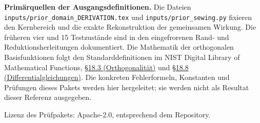 \documentclass[10pt,a4paper]{article}
\begin{document}
\textbf{Primärquellen der Ausgangsdefinitionen.}
Die Dateien \texttt{inputs/prior\_domain\_DERIVATION.tex} und
\texttt{inputs/prior\_sewing.py} fixieren den Kernbereich und die exakte
Rekonstruktion der gemeinsamen Wirkung. Die früheren vier und 15 Testzustände
sind in den eingefrorenen Rand- und Reduktionsherleitungen dokumentiert.
Die Mathematik der orthogonalen Basisfunktionen folgt den Standarddefinitionen
im NIST Digital Library of Mathematical Functions,
\href{https://dlmf.nist.gov/18.3}{§18.3 (Orthogonalität)} und
\href{https://dlmf.nist.gov/18.8}{§18.8 (Differentialgleichungen)}.
Die konkreten Fehlerformeln, Konstanten und Prüfungen dieses Pakets werden
hier hergeleitet; sie werden nicht als Resultat dieser Referenz ausgegeben.

Lizenz des Prüfpakets: Apache-2.0, entsprechend dem Repository.
\end{document}
